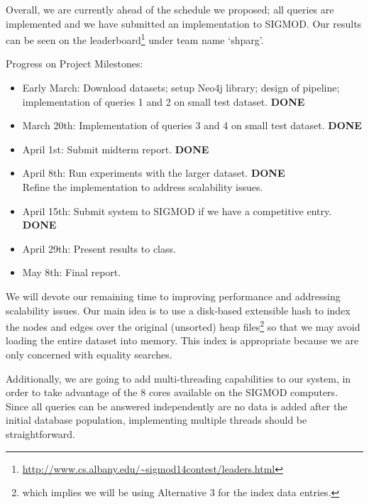 \documentclass{article}
\begin{document}
Overall, we are currently ahead of the schedule we proposed; all queries are implemented and we have submitted an implementation to SIGMOD.  Our results can be seen on the
leaderboard\footnote{\url{http://www.cs.albany.edu/~sigmod14contest/leaders.html}} under team name `shparg'.

Progress on Project Milestones:
\begin{itemize}
\item Early March: Download datasets; setup Neo4j library;
  design of pipeline; implementation of queries 1 and 2 on small test dataset. \textbf{DONE}
\item March 20th: Implementation of queries 3 and 4 on small test dataset. \textbf{DONE}
\item April 1st: Submit midterm report. \textbf{DONE}
\item April 8th:  Run experiments with the larger dataset. \textbf{DONE} \\Refine the implementation to address scalability issues.
\item April 15th: Submit system to SIGMOD if we have a competitive entry. \textbf{DONE}
\item April 29th: Present results to class.
\item May 8th: Final report.
\end{itemize}

We will devote our remaining time to improving performance and
addressing scalability issues.  Our main idea is to use a disk-based
extensible hash to index the nodes and edges over the original
(unsorted) heap files\footnote{which implies we will be using
  Alternative 3 for the index data entries.} so that we may avoid
loading the entire dataset into memory.  This index is appropriate
because we are only concerned with equality searches. 

Additionally, we are going to add multi-threading capabilities to our
system, in order to take advantage of the 8 cores available on the SIGMOD computers. 
Since all queries can be answered independently are no data is added after 
the initial database population, implementing multiple threads should 
be straightforward.



\end{document}
